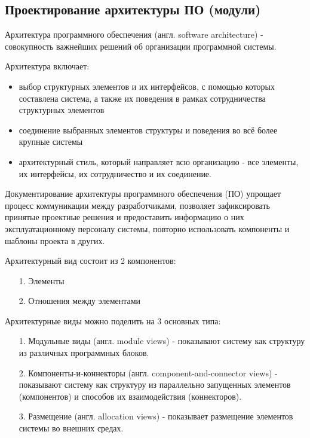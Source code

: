 \subsection{Проектирование архитектуры ПО (модули)}

Архитектура программного обеспечения (англ. software architecture) - совокупность важнейших решений об организации программной системы.

Архитектура включает:

\begin{itemize}
    \item выбор структурных элементов и их интерфейсов, с помощью которых составлена система, а также их поведения в рамках сотрудничества структурных элементов
    \item соединение выбранных элементов структуры и поведения во всё более крупные системы
    \item архитектурный стиль, который направляет всю организацию - все элементы, их интерфейсы, их сотрудничество и их соединение.
\end{itemize}

Документирование архитектуры программного обеспечения (ПО) упрощает процесс коммуникации между разработчиками, позволяет зафиксировать принятые проектные решения и предоставить информацию о них эксплуатационному персоналу системы, повторно использовать компоненты и шаблоны проекта в других.

Архитектурный вид состоит из 2 компонентов:

\begin{enumerate}
    \item [1.] Элементы
    \item [2.] Отношения между элементами
\end{enumerate}

Архитектурные виды можно поделить на 3 основных типа:

\begin{itemize}
    \item [1.] Модульные виды (англ. module views) - показывают систему как структуру из различных программных блоков.
    \item [2.] Компоненты-и-коннекторы (англ. component-and-connector views) - показывают систему как структуру из параллельно запущенных элементов (компонентов) и способов их взаимодействия (коннекторов).
    \item [3.] Размещение (англ. allocation views) - показывает размещение элементов системы во внешних средах.
\end{itemize}

